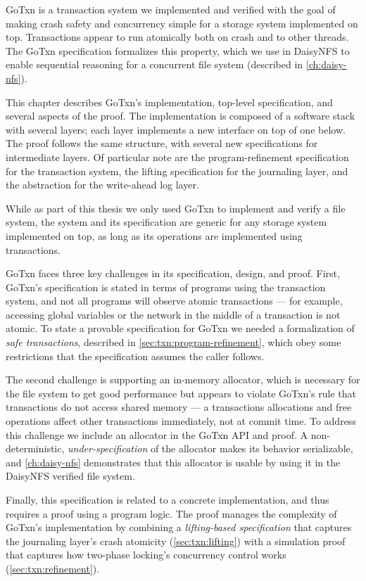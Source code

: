 GoTxn is a transaction system we implemented and verified with the goal of
making crash safety and concurrency simple for a storage system implemented on
top. Transactions appear to run atomically both on crash and to other threads.
The GoTxn specification formalizes this property, which we use in DaisyNFS to
enable sequential reasoning for a concurrent file system (described in
\cref{ch:daisy-nfs}).

This chapter describes GoTxn's implementation, top-level specification, and
several aspects of the proof. The implementation is composed of a software stack
with several layers; each layer implements a new interface on top of one
below. The proof follows the same structure, with several new specifications for
intermediate layers. Of particular note are the
program-refinement specification for the transaction system, the lifting
specification for the journaling layer, and the abstraction for the write-ahead
log layer.

While as part of this thesis we only used GoTxn to implement and verify a file
system, the system and its specification are generic for any
storage system implemented on top, as long as its operations are implemented
using transactions.

GoTxn faces three key challenges in its specification, design, and proof.
First, GoTxn's specification is stated in terms of programs using the
transaction system, and not all programs will observe atomic transactions ---
for example, accessing global variables or the network in the middle of a
transaction is not atomic. To state a provable specification for GoTxn we needed
a formalization of \emph{safe transactions}, described in \cref{sec:txn:program-refinement},
which obey some restrictions that the specification assumes the caller follows.

The second challenge is supporting an in-memory allocator, which is necessary
for the file system to get good performance but appears to violate GoTxn's rule
that transactions do not access shared memory --- a transactions allocations and
free operations affect other transactions immediately, not at commit time.
To address this challenge we include an
allocator in the GoTxn API and proof. A non-deterministic,
\emph{under-specification} of the allocator makes its behavior serializable, and
\cref{ch:daisy-nfs} demonstrates that this allocator is usable by using it in
the DaisyNFS verified file system.

Finally, this specification is related to a concrete implementation, and thus
requires a proof using a program logic. The proof manages the complexity of
GoTxn's implementation by combining a \emph{lifting-based specification} that
captures the journaling layer's crash atomicity (\cref{sec:txn:lifting}) with a
simulation proof that captures how two-phase locking's concurrency control works
(\cref{sec:txn:refinement}).

